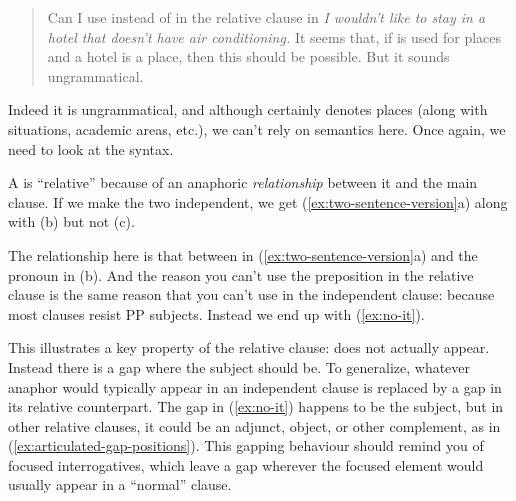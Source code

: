 \begin{quote}
    Can I use  instead of  in the relative clause in \textit{I wouldn't like to stay in a hotel \emph{that doesn't have air conditioning}.} It seems that, if  is used for places and a hotel is a place, then this should be possible. But it sounds ungrammatical.
\end{quote}

Indeed it is ungrammatical, and although  certainly denotes places (along with situations, academic areas, etc.), we can't rely on semantics here. Once again, we need to look at the syntax.

A  is \enquote{relative} because of an anaphoric \emph{relationship} between it and the main clause. If we make the two independent, we get (\ref{ex:two-sentence-version}a) along with (b) but not (c).

\ea\label{ex:two-sentence-version}
    \z
\z
The relationship here is that between  in (\ref{ex:two-sentence-version}a) and the pronoun  in (b). And the reason you can't use the preposition  in the relative clause is the same reason that you can't use  in the independent clause: because most clauses resist PP subjects. Instead we end up with (\ref{ex:no-it}).

\label{ex:no-it}
\z
This illustrates a key property of the relative clause:  does not actually appear. Instead there is a gap where the subject should be. To generalize, whatever anaphor would typically appear in an independent clause is replaced by a gap in its relative counterpart. The gap in (\ref{ex:no-it}) happens to be the subject, but in other relative clauses, it could be an adjunct, object, or other complement, as in (\ref{ex:articulated-gap-positions}). This gapping behaviour should remind you of focused interrogatives, which leave a gap wherever the focused element would usually appear in a ``normal'' clause.

\ea \label{ex:articulated-gap-positions}
    \z
\z
{}

